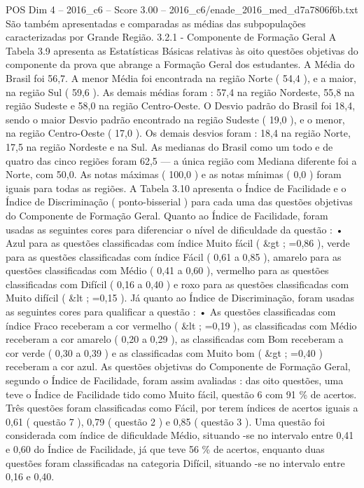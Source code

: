 \begin{textsample}{POS Dim 4 – 2016\_c6 – Score 3.00 – 2016\_c6/enade\_2016\_med\_d7a7806f6b.txt}
São também apresentadas e comparadas as médias das subpopulações caracterizadas por Grande Região. 3.2.1 - Componente de Formação Geral A Tabela 3.9 apresenta as Estatísticas Básicas relativas às oito questões objetivas do componente da prova que abrange a Formação Geral dos estudantes.
A Média do Brasil foi 56,7.
A menor Média foi encontrada na região Norte ( 54,4 ), e a maior, na região Sul ( 59,6 ).
As demais médias foram : 57,4 na região Nordeste, 55,8 na região Sudeste e 58,0 na região Centro-Oeste.
O Desvio padrão do Brasil foi 18,4, sendo o maior Desvio padrão encontrado na região Sudeste ( 19,0 ), e o menor, na região Centro-Oeste ( 17,0 ).
Os demais desvios foram : 18,4 na região Norte, 17,5 na região Nordeste e na Sul.
As medianas do Brasil como um todo e de quatro das cinco regiões foram 62,5 — a única região com Mediana diferente foi a Norte, com 50,0.
As notas máximas ( 100,0 ) e as notas mínimas ( 0,0 ) foram iguais para todas as regiões.
A Tabela 3.10 apresenta o Índice de Facilidade e o Índice de Discriminação ( ponto-bisserial ) para cada uma das questões objetivas do Componente de Formação Geral.
Quanto ao Índice de Facilidade, foram usadas as seguintes cores para diferenciar o nível de dificuldade da questão : • Azul para as questões classificadas com índice Muito fácil ( \&gt ; =0,86 ), verde para as questões classificadas com índice Fácil ( 0,61 a 0,85 ), amarelo para as questões classificadas com Médio ( 0,41 a 0,60 ), vermelho para as questões classificadas com Difícil ( 0,16 a 0,40 ) e roxo para as questões classificadas com Muito difícil ( \&lt ; =0,15 ).
Já quanto ao Índice de Discriminação, foram usadas as seguintes cores para qualificar a questão : • As questões classificadas com índice Fraco receberam a cor vermelho ( \&lt ; =0,19 ), as classificadas com Médio receberam a cor amarelo ( 0,20 a 0,29 ), as classificadas com Bom receberam a cor verde ( 0,30 a 0,39 ) e as classificadas com Muito bom ( \&gt ; =0,40 ) receberam a cor azul.
As questões objetivas do Componente de Formação Geral, segundo o Índice de Facilidade, foram assim avaliadas : das oito questões, uma teve o Índice de Facilidade tido como Muito fácil, questão 6 com 91 \% de acertos.
Três questões foram classificadas como Fácil, por terem índices de acertos iguais a 0,61 ( questão 7 ), 0,79 ( questão 2 ) e 0,85 ( questão 3 ).
Uma questão foi considerada com índice de dificuldade Médio, situando -se no intervalo entre 0,41 e 0,60 do Índice de Facilidade, já que teve 56 \% de acertos, enquanto duas questões foram classificadas na categoria Difícil, situando -se no intervalo entre 0,16 e 0,40.

\end{textsample}
